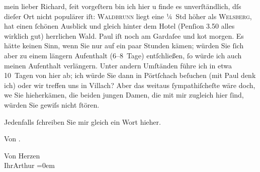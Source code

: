 \pstart
           mein lieber Richard,{ }ſeit vorgeſtern bin ich hier u finde es
               unverſtändlich, dſs dieſer Ort nicht populärer iſt: \textsc{Waldbrunn} liegt eine ¼ Std höher als \textsc{Welsberg}, hat einen{ }ſchönen Ausblick und gleich hinter dem Hotel (Penſion 3.50 alles
               wirklich gut) herrlichen Wald. Paul iſt noch
               am Gardaſee und ko{\geminationm}t morgen. Es hätte keinen Sinn, wenn Sie nur auf ein paar Stunden {\pb}kämen; würden Sie{ }ſich aber zu einem längern
               Aufenthalt (6–8 Tage) entſchließen,{ }ſo würde ich auch meinen Aufenthalt verlängern.
               Unter andern Umſtänden führe ich in etwa 10 Tagen von hier ab; ich würde Sie dann in
                  Pörtſchach beſuchen (mit Paul denk ich) oder wir treffen uns in Villach? {\pb}Aber das weitaus{ }ſympathiſcheſte wäre doch, we{\geminationn} Sie hieherkämen, die
               beiden jungen Damen,
               die mit mir zugleich hier{ }ſind, würden Sie gewiſs nicht{ }ſtören.\pend
           
\pstart
           Jedenfalls{ }ſchreiben Sie mir gleich ein Wort hieher.\pend
           
\pstart
           Von \label{K_L01162-1v}\label{K_L01162-1}.\pend
           
\pstart
           Von Herzen{\\[\baselineskip]}Ihr\spacefill\mbox{Arthur}\pend
           \leftskip=0em{}\endnumbering{}  \newcommand{\dateiname}{L01162}\newcommand{\titel}{Arthur Schnitzler an Richard Beer-Hofmann, 17. 8. 1901}\newcommand{\editorInnen}{Martin Anton Müller und Gerd-Hermann Susen}
